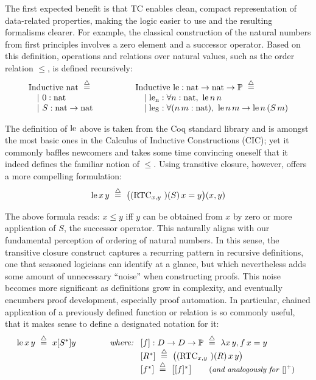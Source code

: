 The first expected benefit is that TC enables clean, compact representation of data-related properties,
making the logic easier to use and the resulting formalisms clearer.
For example, the classical construction of the natural numbers from first principles involves a zero element and a successor operator.
Based on this definition, operations and relations over natural values, such as the order relation $\leq$, is defined recursively:
\[
\begin{array}{l@{\hspace{4em}}l}
\begin{array}[t]{l}
\rInductive~\tnat~\eqdef \\
\quad |~0 : \tnat \\
\quad |~S : \tnat \to\tnat
\end{array}
&
\begin{array}[t]{l}
\rInductive~\fle : \tnat \to \tnat \to \tProp ~\eqdef \\
\quad |~\fctorlen : \forall n:\tnat,~ \fle\,n\,n\\
\quad |~\fctorleS : \forall (n\,m:\tnat),~ \fle\,n\,m\to\fle\,n\,(S\,m)
\end{array}
\end{array}
\]

The definition of $\mathrm{le}$ above is taken from the Coq standard library and is amongst the most basic ones in the Calculus of Inductive Constructions (CIC); yet it commonly baffles newcomers and takes some time convincing oneself that it indeed defines the familiar notion of $\leq$.
Using transitive closure, however, offers a more compelling formulation:
\[
\mathrm{le}\,x\,y ~\overset{\triangle}{=}~ \big((\mathrm{RTC}_{x,y}\,\,)(S)\,x=y\big)(x,y)
\]

The above formula reads: $x\leq y$ iff $y$ can be obtained from $x$ by zero or more application of $S$, the successor operator.
This naturally aligns with our fundamental perception of ordering of natural numbers.
In this sense, the transitive closure construct captures a recurring pattern in recursive definitions, one that seasoned logicians can identify at a glance, but which nevertheless adds some amount of unnecessary ``noise'' when constructing proofs.
This noise becomes more significant as definitions grow in complexity, and eventually encumbers proof development, especially proof automation.
In particular, chained application of a previously defined function or relation is so commonly useful, that it makes sense to define a designated notation for it:
\[
\mathrm{le}\,x\,y ~\overset{\triangle}{=}~ x[S^*]y \hspace{4em}
\textit{where:}~
\begin{array}[t]{l}
  {} [f] : D\to D\to\mathbb{P} ~\overset{\triangle}{=}~ \lambda x\,y, f\,x=y \\
  {} [R^*] ~\overset{\triangle}{=}~ \big((\mathrm{RTC}_{x,y}\,\,)(R)\,x\,y\big) \\
  {} [f^*] ~\overset{\triangle}{=}~ \big[[f]^*\big]  \qquad\textrm{\small(\textit{and analogously for} ${[]}^+$)}
\end{array}
\]


